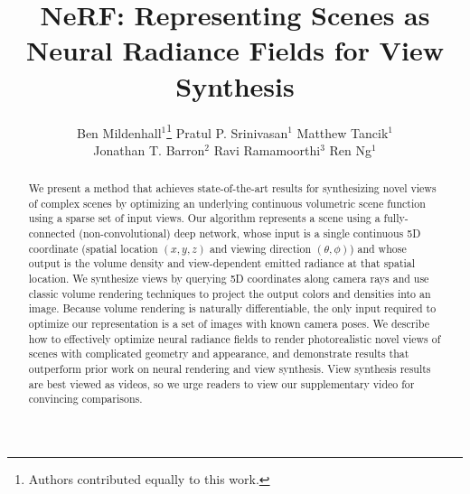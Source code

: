 \documentclass[runningheads]{llncs}
\makeatletter
\newcommand{\angletheta}{\theta}
\newcommand{\anglephi}{\phi}
\newcommand{\printfnsymbol}[1]{\textsuperscript{\@fnsymbol{#1}}}
\makeatother
\begin{document}
\pagestyle{headings}
\mainmatter
\def\ECCVSubNumber{1473}  

\title{NeRF: Representing Scenes as \\ Neural Radiance Fields for View Synthesis} 





\author{Ben Mildenhall$^1$\thanks{Authors contributed equally to this work.}
\quad
Pratul P. Srinivasan$^1$\printfnsymbol{1}
\quad
Matthew Tancik$^1$\printfnsymbol{1} \\
Jonathan T. Barron$^2$
\quad
Ravi Ramamoorthi$^3$
\quad
Ren Ng$^1$ 
}

\maketitle

\begin{abstract}

We present a method that achieves state-of-the-art results for synthesizing novel views of complex scenes by optimizing an underlying continuous volumetric scene function using a sparse set of input views. Our algorithm represents a scene using a fully-connected (non-convolutional) deep network, whose input is a single continuous 5D coordinate (spatial location $(x,y,z)$ and viewing direction $(\angletheta,\anglephi)$) and whose output is the volume density and view-dependent emitted radiance at that spatial location. We synthesize views by querying 5D coordinates along camera rays and use classic volume rendering techniques to project the output colors and densities into an image. Because volume rendering is naturally differentiable, the only input required to optimize our representation is a set of images with known camera poses. We describe how to effectively optimize neural radiance fields to render photorealistic novel views of scenes with complicated geometry and appearance, and demonstrate results that outperform prior work on neural rendering and view synthesis. View synthesis results are best viewed as videos, so we urge readers to view our supplementary video for convincing comparisons. 

\end{abstract}
\end{document}
